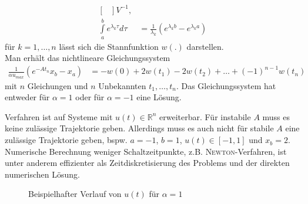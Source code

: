 \begin{exmp}
\begin{align*}
\begin{bmatrix}
	\end{bmatrix}V^{-1},\\
	\int\limits_a^b e^{\lambda_k \tau}d\tau & = \frac{1}{\lambda_k}\left(e^{\lambda_k b}-e^{\lambda_k a} \right)
\end{align*}
für $k=1,\ldots,n$ lässt sich die Stannfunktion $w(.)$ darstellen.\\
Man erhält das nichtlineare Gleichungssystem
\begin{align*}
	\frac{1}{\alpha u_{max}}\left(e^{-At_n}x_b-x_a \right) & = -w(0) + 2 w(t_1) - 2 w(t_2) + \ldots +(-1)^{n-1}w(t_n)
\end{align*}
mit $n$ Gleichungen und $n$ Unbekannten $t_1,\ldots,t_n$. Das Gleichungssystem hat entweder für $\alpha = 1$ oder für $\alpha = -1$ eine Lösung.
\begin{remark}
Verfahren ist auf Systeme mit $u(t)\in\mathbb{R}^n$ erweiterbar. Für instabile $A$ muss es keine zulässige Trajektorie geben. Allerdings muss es auch
nicht für stabile $A$ eine zulässige Trajektorie geben, bspw. $a=-1$, $b=1$, $u(t)\in[-1,1]$ und $x_b=2$.\\
Numerische Berechnung weniger Schaltzeitpunkte, z.B. \textsc{Newton}-Verfahren, ist unter anderem effizienter als Zeitdiskretisierung des Problems und
der direkten numerischen Lösung.
\end{remark}
\begin{figure}[htb]
	\centering
	
	\caption{Beispielhafter Verlauf von $u(t)$ für $\alpha=1$}
	\label{fig:kap_2_bsp_2_zustands_u_pont}
\end{figure}
\end{exmp}
